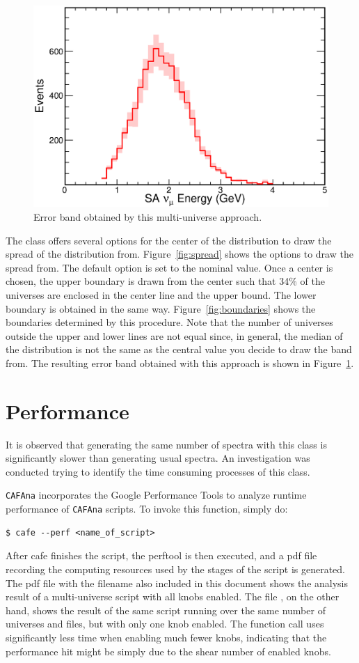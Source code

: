\documentclass[12pt,a4paper,final]{iopart}
\begin{document}
\begin{figure}[h]
  \centering
  \includegraphics[width=.75\textwidth]{figures/reco_nue_w_error.eps}
  \caption{Error band obtained by this multi-universe approach.}
  \label{fig:reco_nue_w_error}
\end{figure}

The class offers several options for the center of the distribution to draw the spread of the distribution from. Figure~\ref{fig:spread} shows the options to draw the spread from. The default option is set to the nominal value. Once a center is chosen, the upper boundary is drawn from the center such that 34\% of the universes are enclosed in the center line and the upper bound. The lower boundary is obtained in the same way. Figure~\ref{fig:boundaries} shows the boundaries determined by this procedure. Note that the number of universes outside the upper and lower lines are not equal since, in general, the median of the distribution is not the same as the central value you decide to draw the band from. The resulting error band obtained with this approach is shown in Figure~\ref{fig:reco_nue_w_error}.

\section{Performance}
It is observed that generating the same number of spectra with this class is significantly slower than generating usual spectra. An investigation was conducted trying to identify the time consuming processes of this class.

\texttt{CAFAna} incorporates the Google Performance Tools to analyze runtime performance of \texttt{CAFAna} scripts. To invoke this function, simply do:
\begin{verbatim}
$ cafe --perf <name_of_script>
\end{verbatim}
After cafe finishes the script, the perftool is then executed, and a pdf file recording the computing resources used by the stages of the script is generated. The pdf file with the filename  also included in this document shows the analysis result of a multi-universe script with all knobs enabled. The file , on the other hand, shows the result of the same script running over the same number of universes and files, but with only one knob enabled. The  function call uses significantly less time when enabling much fewer knobs, indicating that the performance hit might be simply due to the shear number of enabled knobs.
\end{document}

